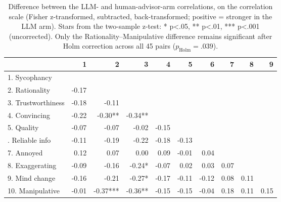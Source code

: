 \begin{table}

\caption{\label{tab:cor_diff}Difference between the LLM- and human-advisor-arm correlations, on the correlation scale (Fisher z-transformed, subtracted, back-transformed; positive = stronger in the LLM arm). Stars from the two-sample z-test: * p<.05, ** p<.01, *** p<.001 (uncorrected). Only the Rationality--Manipulative difference remains significant after Holm correction across all 45 pairs ($p_{\mathrm{Holm}} = .039$).}
\centering
\begin{tabular}[t]{lrrrrrrrrr}
\toprule
  & 1 & 2 & 3 & 4 & 5 & 6 & 7 & 8 & 9\\
\midrule
1. Sycophancy &  &  &  &  &  &  &  &  & \\
2. Rationality & -0.17 &  &  &  &  &  &  &  & \\
3. Trustworthiness & -0.18 & -0.11 &  &  &  &  &  &  & \\
4. Convincing & -0.22 & -0.30** & -0.34** &  &  &  &  &  & \\
5. Quality & -0.07 & -0.07 & -0.02 & -0.15 &  &  &  &  & \\
\addlinespace
6. Reliable info & -0.11 & -0.19 & -0.22 & -0.18 & -0.13 &  &  &  & \\
7. Annoyed & 0.12 & 0.07 & 0.00 & 0.09 & -0.01 & 0.04 &  &  & \\
8. Exaggerating & -0.09 & -0.16 & -0.24* & -0.07 & 0.02 & 0.03 & 0.07 &  & \\
9. Mind change & -0.16 & -0.21 & -0.27* & -0.17 & -0.11 & -0.12 & 0.08 & 0.11 & \\
10. Manipulative & -0.01 & -0.37*** & -0.36** & -0.15 & -0.15 & -0.04 & 0.18 & 0.11 & 0.15\\
\bottomrule
\end{tabular}
\end{table}
